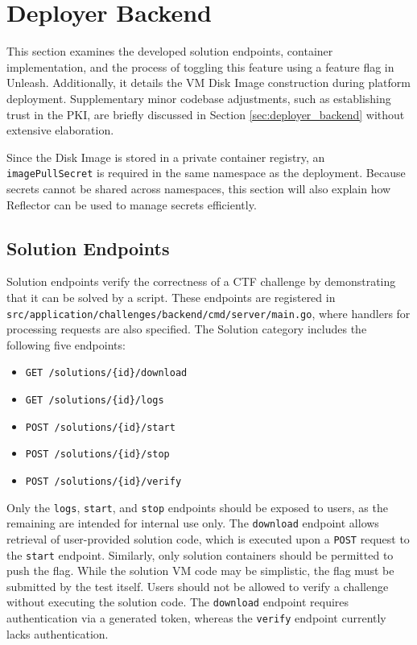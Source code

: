 \section{Deployer Backend}
This section examines the developed solution endpoints, container implementation, and the process of toggling this feature using a feature flag in Unleash. Additionally, it details the VM Disk Image construction during platform deployment. Supplementary minor codebase adjustments, such as establishing trust in the PKI, are briefly discussed in Section \ref{sec:deployer_backend} without extensive elaboration.

Since the Disk Image is stored in a private container registry, an \texttt{imagePullSecret} is required in the same namespace as the deployment. Because secrets cannot be shared across namespaces, this section will also explain how Reflector can be used to manage secrets efficiently.

\subsection{Solution Endpoints}
Solution endpoints verify the correctness of a CTF challenge by demonstrating that it can be solved by a script. These endpoints are registered in \texttt{src/application/challenges/backend/cmd/server/main.go}, where handlers for processing requests are also specified. The Solution category includes the following five endpoints:

\begin{itemize}
    \item \texttt{GET /solutions/\{id\}/download}
    \item \texttt{GET /solutions/\{id\}/logs}
    \item \texttt{POST /solutions/\{id\}/start}
    \item \texttt{POST /solutions/\{id\}/stop}
    \item \texttt{POST /solutions/\{id\}/verify}
\end{itemize}

Only the \texttt{logs}, \texttt{start}, and \texttt{stop} endpoints should be exposed to users, as the remaining are intended for internal use only. The \texttt{download} endpoint allows retrieval of user-provided solution code, which is executed upon a \texttt{POST} request to the \texttt{start} endpoint. Similarly, only solution containers should be permitted to push the flag. While the solution VM code may be simplistic, the flag must be submitted by the test itself. Users should not be allowed to verify a challenge without executing the solution code. The \texttt{download} endpoint requires authentication via a generated token, whereas the \texttt{verify} endpoint currently lacks authentication.

